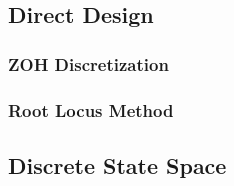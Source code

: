 \subsection{Direct Design}

\subsubsection{ZOH Discretization}

\subsubsection{Root Locus Method}

\subsection{Discrete State Space}
